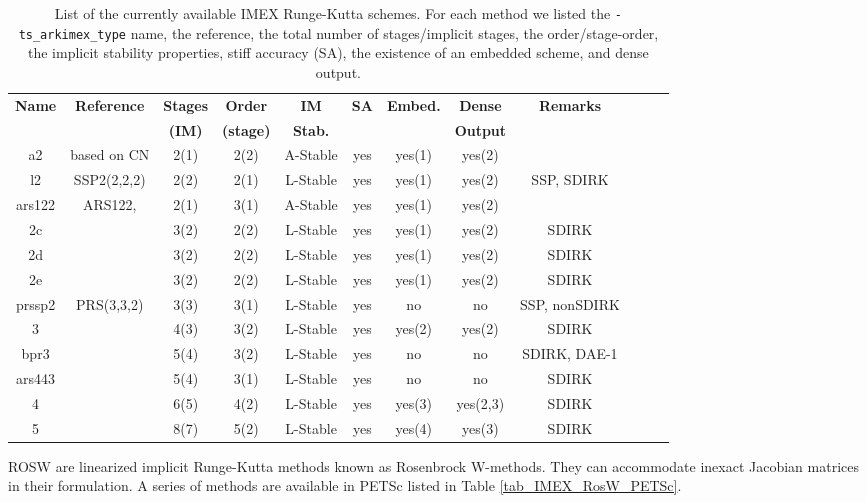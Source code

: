 \begin{table}
\centering
\begin{tabular}{cccccccccccc}
\hline
{\bf Name}&{\bf Reference} &{\bf Stages} &{\bf Order}&{\bf IM}     &{\bf SA}&{\bf Embed.}&{\bf Dense}& {\bf Remarks}\\
 &  &{\bf (IM)}   &{\bf (stage)}& {\bf Stab.}&&      &{\bf Output}&\\
\hline
a2&based on CN&2(1)&2(2)&A-Stable&yes&yes(1)&yes(2)&\\
l2&SSP2(2,2,2)\cite{Pareschi_2005}
&2(2)&2(1)&L-Stable&yes&yes(1)&yes(2)&SSP, SDIRK\\
ars122&ARS122,
\cite{Ascher_1997}&2(1)&3(1)&A-Stable&yes&yes(1)&yes(2)&\\
2c&\cite{Giraldo_2013}&3(2)&2(2)&L-Stable&yes&yes(1)&yes(2)&SDIRK\\
2d&\cite{Giraldo_2013}&3(2)&2(2)&L-Stable&yes&yes(1)&yes(2)&SDIRK\\
2e&\cite{Giraldo_2013}&3(2)&2(2)&L-Stable&yes&yes(1)&yes(2)&SDIRK\\
prssp2&PRS(3,3,2)
\cite{Pareschi_2005}&3(3)&3(1)&L-Stable&yes&no&no&SSP, nonSDIRK\\
3&\cite{Kennedy_2003}&4(3)&3(2)&L-Stable&yes&yes(2)&yes(2)&SDIRK\\
bpr3&\cite{Boscarino_TR2011}&5(4)&3(2)&L-Stable&yes&no&no&SDIRK, DAE-1\\
ars443&\cite{Ascher_1997}&5(4)&3(1)&L-Stable&yes&no&no&SDIRK\\
4&\cite{Kennedy_2003}&6(5)&4(2)&L-Stable&yes&yes(3)&yes(2,3)&SDIRK\\
5&\cite{Kennedy_2003}&8(7)&5(2)&L-Stable&yes&yes(4)&yes(3)&SDIRK\\
\hline
\end{tabular}
\caption{\label{tab_IMEX_RK_PETSc} List of the  currently available
IMEX Runge-Kutta schemes.  For each method we listed the \texttt{-ts\_arkimex\_type}
  name, the reference, the
  total number
  of stages/implicit stages, the order/stage-order,
  the implicit stability properties, stiff accuracy (SA), the
  existence of an embedded scheme, and dense output.}
\end{table}
%

ROSW are linearized implicit Runge-Kutta methods known as Rosenbrock
W-methods. They can accommodate inexact Jacobian matrices in their
formulation. A series of methods are available in PETSc listed in
Table \ref{tab_IMEX_RosW_PETSc}.

